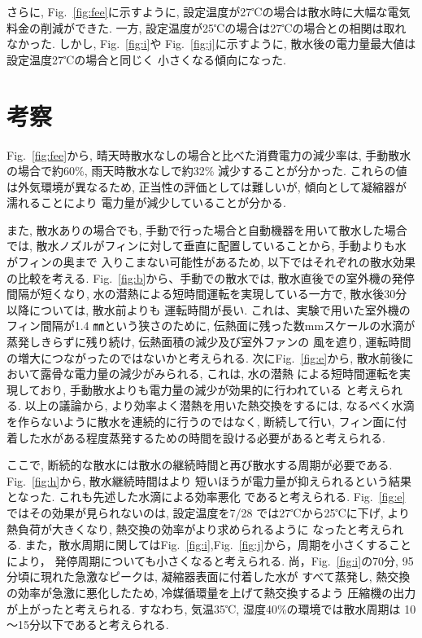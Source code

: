 \documentclass[a4j,fleqn,dvipdfmx,uplatex]{jsarticle}
\newcommand{\figref}[1]{Fig.\ \ref{#1}}
\begin{document}
さらに, \figref{fig:fee}に示すように, 設定温度が27℃の場合は散水時に大幅な電気料金の削減ができた. 
一方, 設定温度が25℃の場合は27℃の場合との相関は取れなかった. しかし, \figref{fig:i}や
\figref{fig:j}に示すように, 散水後の電力量最大値は設定温度27℃の場合と同じく
小さくなる傾向になった. 



\section{考察}\label{sec4}
\figref{fig:fee}から, 晴天時散水なしの場合と比べた消費電力の減少率は, 手動散水の場合で約60\%, 
雨天時散水なしで約32\% 減少することが分かった. 
これらの値は外気環境が異なるため, 正当性の評価としては難しいが, 傾向として凝縮器が濡れることにより
電力量が減少していることが分かる. 

また, 散水ありの場合でも, 手動で行った場合と自動機器を用いて散水した場合では, 
散水ノズルがフィンに対して垂直に配置していることから, 手動よりも水がフィンの奥まで
入りこまない可能性があるため, 以下ではそれぞれの散水効果の比較を考える. 
\figref{fig:b}から、手動での散水では, 散水直後での室外機の発停間隔が短くなり, 
水の潜熱による短時間運転を実現している一方で, 散水後30分以降については, 散水前よりも
運転時間が長い. これは、実験で用いた室外機のフィン間隔が1.4 ㎜という狭さのために, 
伝熱面に残った数mmスケールの水滴が蒸発しきらずに残り続け, 伝熱面積の減少及び室外ファンの
風を遮り, 運転時間の増大につながったのではないかと考えられる.
次に\figref{fig:e}から, 散水前後において露骨な電力量の減少がみられる, これは, 水の潜熱
による短時間運転を実現しており, 手動散水よりも電力量の減少が効果的に行われている
と考えられる.
以上の議論から, より効率よく潜熱を用いた熱交換をするには, なるべく水滴を作らないように散水を連続的に行うのではなく, 
断続して行い, フィン面に付着した水がある程度蒸発するための時間を設ける必要があると考えられる.

ここで, 断続的な散水には散水の継続時間と再び散水する周期が必要である. \figref{fig:h}から, 散水継続時間はより
短いほうが電力量が抑えられるという結果となった. これも先述した水滴による効率悪化
であると考えられる. \figref{fig:e}ではその効果が見られないのは, 設定温度を7/28
では27℃から25℃に下げ, より熱負荷が大きくなり, 熱交換の効率がより求められるように
なったと考えられる. 
また，散水周期に関しては\figref{fig:i},\figref{fig:j}から，周期を小さくすることにより，
発停周期についても小さくなると考えられる. 
尚，\figref{fig:i}の70分, 95分頃に現れた急激なピークは, 凝縮器表面に付着した水が
すべて蒸発し, 熱交換の効率が急激に悪化したため, 冷媒循環量を上げて熱交換するよう
圧縮機の出力が上がったと考えられる. すなわち, 気温35℃, 湿度40\%の環境では散水周期は
10～15分以下であると考えられる. 
\end{document}
